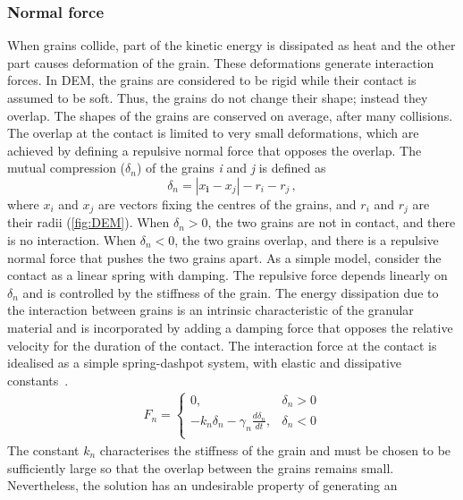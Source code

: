 \subsubsection*{Normal force}
When grains collide, part of the kinetic energy is dissipated as 
heat and the other part causes deformation of the grain. These deformations 
generate interaction forces. In DEM, the grains are considered to be rigid 
while their contact is assumed to be soft. Thus, the grains do not change their 
shape; instead they overlap. The shapes of the grains are conserved on average, 
after many collisions. The overlap at the contact is limited to very small 
deformations, which are achieved by defining a repulsive normal force that 
opposes the overlap. The mutual compression ($\delta_{n}$) of the grains 
\textit{i} and \textit{j} is defined as
%
\begin{equation}
 \delta_{n}=\left|x_{\mathbf{i}}-x_{\mathit{j}}\right|-r_{i}-r_{j} \,,
\label{eq:delta}
\end{equation}
%
where $x_{\mathit{i}}$ and $x_{\mathit{j}}$ are vectors fixing the centres of 
the grains, and 
$r_{\mathit{i}}$ and $r_{\mathit{j}}$ are their radii (\cref{fig:DEM}). When 
$\delta_{n}>0$, the two grains are not in contact, and 
there is no interaction. When $\delta_{n}<0$, the two grains overlap, and 
there is a repulsive normal force that pushes the two grains apart. As a 
simple model, consider the contact as a linear spring with damping. The 
repulsive force depends linearly on $\delta_{n}$ and is controlled by the 
stiffness of the grain. The energy dissipation due to the interaction between 
grains is an intrinsic characteristic of the granular material and is 
incorporated by adding a damping force that opposes the relative velocity for 
the duration of the contact. The interaction force at the contact is idealised 
as a simple spring-dashpot system, with elastic and dissipative 
constants~\citep{Luding1994}. 
%
\begin{align}
 {{F}_{n}}=
\begin{cases}
0, & {{\delta}_{n}}>0 \\
-{{k}_{n}}{{\delta}_{n}}-{{\gamma}_{n}}\frac{d{{\delta}_{n}}}{dt}, & 
{{\delta}_{n}}<0 \\
\end{cases}
\end{align} 
%
The constant ${k}_{n}$ characterises the stiffness of the grain and must be 
chosen to be sufficiently large so that the overlap between the grains remains 
small. Nevertheless, the solution has an undesirable property of generating an 
